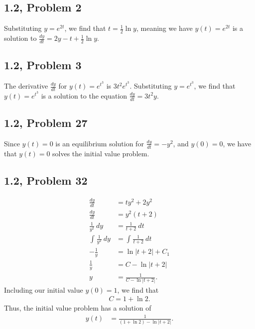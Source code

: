 \documentclass[10pt]{mypackage}
\begin{document}
\subsection{1.2, Problem 2}%
Substituting $y=e^{2t}$, we find that $t = \frac{1}{2}\ln y$, meaning we have $y(t) = e^{2t}$ is a solution to $\frac{dy}{dt} = 2y - t + \frac{1}{2}\ln y$.
\subsection{1.2, Problem 3}%
The derivative $\frac{dy}{dt}$ for $y(t) = e^{t^3}$ is $3t^2 e^{t^3}$. Substituting $y = e^{t^3}$, we find that $y(t) = e^{t^3}$ is a solution to the equation $\frac{dy}{dt} = 3t^2y$.
\subsection{1.2, Problem 27}%
Since $y(t) = 0$ is an equilibrium solution for $\frac{dy}{dt} = -y^2$, and $y(0) = 0$, we have that $y(t) = 0$ solves the initial value problem.
\subsection{1.2, Problem 32}%
\begin{align*}
  \frac{dy}{dt} &= ty^2 + 2y^2\\
  \frac{dy}{dt} &= y^2\left(t+2\right)\\
  \frac{1}{y^2}\:dy &= \frac{1}{t+2}\:dt\\
  \int_{}^{} \frac{1}{y^2}\:dy &= \int_{}^{} \frac{1}{t+2}\:dt\\
  -\frac{1}{y} &= \ln\left\vert t+2 \right\vert + C_1\\
  \frac{1}{y} &= C  - \ln \left\vert t+2 \right\vert\\
  y &= \frac{1}{C - \ln \left\vert t+2 \right\vert}.
\end{align*}
Including our initial value $y(0) = 1$, we find that
\begin{align*}
  C = 1 + \ln 2.
\end{align*}
Thus, the initial value problem has a solution of
\begin{align*}
  y(t) &= \frac{1}{\left(1 + \ln 2\right) - \ln \left\vert t+2 \right\vert}.
\end{align*}
\end{document}
